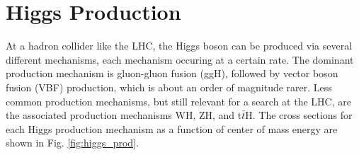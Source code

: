 

\section{Higgs Production}

At a hadron collider like the LHC, the Higgs boson can be produced via several different mechanisms, each mechanism occuring at a certain rate. The dominant production 
mechanism is gluon-gluon fusion (ggH), followed by vector boson fusion (VBF) production, which is about an order of magnitude rarer. Less common production mechanisms, but 
still relevant for a search at the LHC, are the associated production mechanisms WH, ZH, and t$\bar{t}$H. The cross sections for each Higgs production mechanism as a function of 
center of mass energy are shown in Fig. \ref{fig:higgs_prod}.

